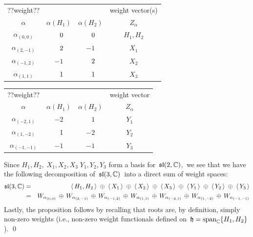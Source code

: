 \begin{center}
\begin{tabular}{|c|c|c|c|}
\hline
{\color{white}??}{\color{red}weight}{\color{white}??}& & & {\color{red}weight} vector(s) \\
$\alpha$ & $\alpha(H_{1})$ & $\alpha(H_{2})$ & $Z_{\alpha}$ \\
\hline\hline
$\alpha_{(0,0)}$ & ${\color{white}+}0$ & ${\color{white}+}0$ & $H_{1},H_{2}$ \\
\hline
$\alpha_{(2,-1)}$ & ${\color{white}+}2$ & $-1$ & $X_{1}$ \\
\hline
$\alpha_{(-1,2)}$ & $-1$ & ${\color{white}+}2$ & $X_{2}$ \\
\hline
$\alpha_{(1,1)}$ & ${\color{white}+}1$ & ${\color{white}+}1$ & $X_{3}$ \\
\hline
\end{tabular}
\quad\quad
\begin{tabular}{|c|c|c|c|}
\hline
{\color{white}??}{\color{red}weight}{\color{white}??}& & & {\color{red}weight} vector \\
$\alpha$ & $\alpha(H_{1})$ & $\alpha(H_{2})$ & $Z_{\alpha}$ \\
\hline\hline
$\alpha_{(-2,1)}$ & $-2$ & ${\color{white}+}1$ & $Y_{1}$ \\
\hline
$\alpha_{(1,-2)}$ & ${\color{white}+}1$ & $-2$ & $Y_{2}$ \\
\hline
$\alpha_{(-1,-1)}$ & $-1$ & $-1$ & $Y_{3}$ \\
\hline
\end{tabular}
\end{center}
Since
\;$H_{1},H_{2},\; X_{1},X_{2},X_{3}\; Y_{1},Y_{2},Y_{3}$\;
form a basis for \,$\mathfrak{sl}(2,\mathbb{C})$,\, we see that we have the following
decomposition of \,$\mathfrak{sl}(3,\mathbb{C})$\, into a direct sum of weight spaces:
\begin{eqnarray*}
\mathfrak{sl}(3,\mathbb{C})
& = &
    \langle\,H_{1},H_{2}\,\rangle
    \;\oplus\;
    \langle\,X_{1}\,\rangle
    \;\oplus\;
    \langle\,X_{2}\,\rangle
    \;\oplus\;
    \langle\,X_{3}\,\rangle
    \;\oplus\;
    \langle\,Y_{1}\,\rangle
    \;\oplus\;
    \langle\,Y_{2}\,\rangle
    \;\oplus\;
    \langle\,Y_{3}\,\rangle
\\
& = &
    W_{\alpha_{(0,0)}}
    \,\oplus\,
    W_{\alpha_{(2,-1)}}
    \,\oplus\,
    W_{\alpha_{(-1,2)}}
    \,\oplus\,
    W_{\alpha_{(1,1)}}
    \,\oplus\,
    W_{\alpha_{(-2,1)}}
    \,\oplus\,
    W_{\alpha_{(1,-2)}}
    \,\oplus\,
    W_{\alpha_{(-1,-1)}}
\end{eqnarray*}
Lastly, the proposition follows by recalling that roots are, by definition,
simply non-zero weights (i.e., non-zero weight functionals defined on
\,$\mathfrak{h} = \textnormal{span}_{\mathbb{C}}\{H_{1},H_{2}\}$).
\qed

